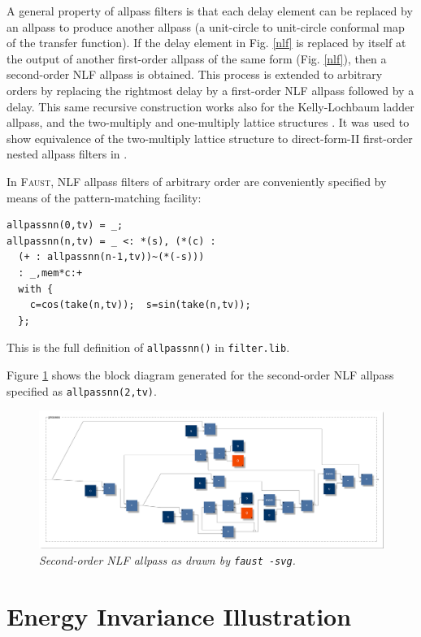 \documentclass[twoside,a4paper]{article}
\newcommand{\Faust}{\textsc{Faust}}
\begin{document}
A general property of allpass filters is that each delay element can
be replaced by an allpass to produce another allpass (a
unit-circle to unit-circle conformal map of the transfer function).  If the
delay element in Fig.{} \ref{nlf} is replaced by itself at the output
of another first-order allpass of the same form (Fig.{} \ref{nlf}),
then a second-order NLF allpass is obtained.  This process is extended
to arbitrary orders by replacing the rightmost delay by a first-order
NLF allpass followed by a delay.  This same recursive construction
works also for the Kelly-Lochbaum ladder allpass, and the
two-multiply and one-multiply lattice structures \cite{MG,PASP}.
It was used to show equivalence of the two-multiply lattice structure
to direct-form-II first-order nested allpass filters in
\cite{MassieAES93,MG}.  

In \Faust, NLF allpass filters of arbitrary order are conveniently
specified by means of the pattern-matching facility:
\begin{samepage}
\begin{verbatim}
allpassnn(0,tv) = _;
allpassnn(n,tv) = _ <: *(s), (*(c) : 
  (+ : allpassnn(n-1,tv))~(*(-s))) 
  : _,mem*c:+
  with { 
    c=cos(take(n,tv));  s=sin(take(n,tv)); 
  };
\end{verbatim}
\end{samepage}
This is the full definition of \texttt{allpassnn()} in 
\texttt{filter.lib}.

Figure \ref{nlf2} shows the block diagram generated for the
second-order NLF allpass specified as \texttt{allpassnn(2,tv)}.

\begin{figure}[ht]
\center
\includegraphics[width=6.5in]{fig/nlf2.pdf}
\caption{\label{nlf2}{\it Second-order NLF allpass as drawn by
    \texttt{faust -svg}.}}
\end{figure} 

\section{Energy Invariance Illustration}
\end{document}
